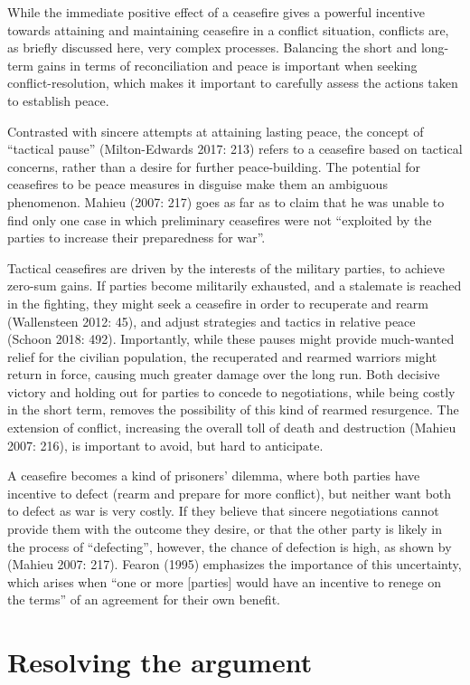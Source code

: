 \documentclass[12pt,twoside]{reedthesis}
\begin{document}
While the immediate positive effect of a ceasefire gives a powerful
incentive towards attaining and maintaining ceasefire in a conflict
situation, conflicts are, as briefly discussed here, very complex
processes. Balancing the short and long-term gains in terms of
reconciliation and peace is important when seeking conflict-resolution,
which makes it important to carefully assess the actions taken to
establish peace.

Contrasted with sincere attempts at attaining lasting peace, the concept
of ``tactical pause'' (Milton-Edwards 2017: 213) refers to a ceasefire
based on tactical concerns, rather than a desire for further
peace-building. The potential for ceasefires to be peace measures in
disguise make them an ambiguous phenomenon. Mahieu (2007: 217) goes as
far as to claim that he was unable to find only one case in which
preliminary ceasefires were not ``exploited by the parties to increase
their preparedness for war''.

Tactical ceasefires are driven by the interests of the military parties,
to achieve zero-sum gains. If parties become militarily exhausted, and a
stalemate is reached in the fighting, they might seek a ceasefire in
order to recuperate and rearm (Wallensteen 2012: 45), and adjust
strategies and tactics in relative peace (Schoon 2018: 492).
Importantly, while these pauses might provide much-wanted relief for the
civilian population, the recuperated and rearmed warriors might return
in force, causing much greater damage over the long run. Both decisive
victory and holding out for parties to concede to negotiations, while
being costly in the short term, removes the possibility of this kind of
rearmed resurgence. The extension of conflict, increasing the overall
toll of death and destruction (Mahieu 2007: 216), is important to avoid,
but hard to anticipate.

A ceasefire becomes a kind of prisoners' dilemma, where both parties
have incentive to defect (rearm and prepare for more conflict), but
neither want both to defect as war is very costly. If they believe that
sincere negotiations cannot provide them with the outcome they desire,
or that the other party is likely in the process of ``defecting'',
however, the chance of defection is high, as shown by (Mahieu 2007:
217). Fearon (1995) emphasizes the importance of this uncertainty, which
arises when ``one or more {[}parties{]} would have an incentive to
renege on the terms'' of an agreement for their own benefit.

\section{Resolving the argument}\label{resolving-the-argument}
\end{document}
